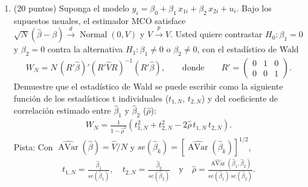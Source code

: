 \documentclass[letterpaper,11pt]{article}
\theoremstyle{plain}
\theoremstyle{definition}
\theoremstyle{remark}
\DeclareMathOperator{\Avar}{AVar}
\newcommand{\pto}{\stackrel{p}{\longrightarrow}}
\newcommand{\dto}{\stackrel{d}{\longrightarrow}}
\DeclareMathOperator{\N}{Normal}
\begin{document}
\begin{enumerate}
    \emph{Realice los siguientes ejercicios con los datos del a\~no 1955.}
    \begin{enumerate}
        \item (5 puntos) Estime la funci\'on de costos
        \begin{align*}
        \log(tc_i)=\beta_0+\beta_1 \log(pl_i)+\beta_2 \log(pk_i)+\beta_3 \log(pf_i)+\beta_4 \log(q_i)+u_i.
        \end{align*}
        Escriba $\beta_1$, $\beta_2$, $\beta_3$ y $\beta_4$ en funci\'on de $\alpha_l$,
        $\alpha_k$ y $\alpha_f$.
        \item (5 puntos) Muestre que la funci\'on de costos implica
            $\beta_1+\beta_2+\beta_3=1$ (homogeneidad de grado uno en precios: si todos los
            precios de los insumos se multiplican por $\lambda>0$, el costo total se
            multiplica por $\lambda$). Contraste esta restricci\'on: es una forma de contrastar
            con datos el modelo de minimizaci\'on de costos.
        \item (10 puntos) Utilice el coeficiente de $\log(q_i)$ para construir un intervalo de
            confianza al 95\% para los rendimientos a escala, $\alpha_l+\alpha_k+\alpha_f$.
            Contraste la hip\'otesis de rendimientos constantes a escala contra la alternativa
            bilateral.
    \end{enumerate}

\item (20 puntos) Suponga el modelo $y_i=\beta_0+\beta_1\,x_{1i}+\beta_2\,x_{2i}+u_i$. Bajo
    los supuestos usuales, el estimador MCO satisface $\sqrt{N}(\hat \beta-\beta)\dto\N(0,V)$ y
    $\hat V \pto V$. Usted quiere contrastar $H_0: \beta_1 = 0$ y $\beta_2 = 0$ contra la
    alternativa $H_1: \beta_1 \neq 0$ o $\beta_2 \neq 0$, con el estad\'istico de Wald
    \begin{align*}
    W_N=N\,(R'\hat \beta)'(R'\hat V R)^{-1}(R'\hat \beta), \qquad \text{donde} \qquad
    R'=\left(\begin{array}{ccc} 0 & 1 & 0\\ 0 & 0 & 1\end{array}\right).
    \end{align*}
    Demuestre que el estad\'istico de Wald se puede escribir como la siguiente funci\'on de los
    estad\'isticos t individuales ($t_{1,N}$, $t_{2,N}$) y del coeficiente de correlaci\'on
    estimado entre $\hat \beta_1$ y $\hat \beta_2$ ($\hat\rho$):
    \begin{align*}
    W_N = \frac{1}{1-\hat\rho^2}\left(t_{1,N}^2 + t_{2,N}^2-2 \hat \rho\, t_{1,N}\,t_{2,N}\right).
    \end{align*}
    Pista: Con $\widehat{\Avar}(\hat\beta)=\hat V/N$ y
    $se(\hat\beta_k)=[\widehat{\Avar}(\hat\beta_k)]^{1/2}$,
    \begin{align*}
    t_{1,N} = \frac{\hat \beta_1}{se(\hat \beta_1)}, \quad
    t_{2,N} = \frac{\hat \beta_2}{se(\hat \beta_2)} \quad \text{y} \quad
    \hat \rho =\frac{ \widehat{\Avar}(\hat \beta_1,\hat \beta_2)}{ se(\hat \beta_1)\, se(\hat \beta_2)}.
    \end{align*}


\end{enumerate}
\end{document}
